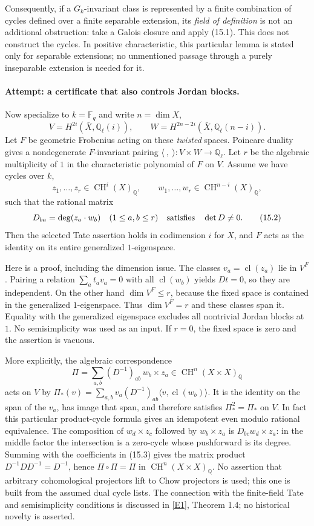 \documentclass[11pt,a4paper]{article}
\newcommand{\Q}{\mathbb{Q}}
\newcommand{\F}{\mathbb{F}}
\newcommand{\eref}[2]{\hyperlink{extra:#1:#2}{[E#2]}}
\begin{document}
Consequently, if a $G_k$-invariant class is represented by a finite
combination of cycles defined over a finite separable extension, its
\emph{field of definition} is not an additional obstruction: take a
Galois closure and apply (15.1). This does not construct the cycles.
In positive characteristic, this particular lemma is stated only for
separable extensions; no unmentioned passage through a purely inseparable
extension is needed for it.

\paragraph{Attempt: a certificate that also controls Jordan blocks.}
Now specialize to $k=\F_q$ and write $n=\dim X$,
\[
 V=H^{2i}(\bar X,\Q_\ell(i)),\qquad
 W=H^{2n-2i}(\bar X,\Q_\ell(n-i)).
\]
Let $F$ be geometric Frobenius acting on these \emph{twisted} spaces.
Poincare duality gives a nondegenerate $F$-invariant pairing
$\langle\ ,\ \rangle:V\times W\to\Q_\ell$.
Let $r$ be the algebraic multiplicity of $1$ in the characteristic
polynomial of $F$ on $V$. Assume we have cycles over $k$,
\[
 z_1,\ldots,z_r\in\operatorname{CH}^i(X)_{\Q},\qquad
 w_1,\ldots,w_r\in\operatorname{CH}^{n-i}(X)_{\Q},
\]
such that the rational matrix
\[
 D_{ba}=\deg(z_a\cdot w_b)\quad(1\leq a,b\leq r)
 \quad\hbox{satisfies}\quad\det D\ne0. \tag{15.2}
\]
Then the selected Tate assertion holds in codimension $i$ for $X$,
and $F$ acts as the identity on its entire generalized $1$-eigenspace.

Here is a proof, including the dimension issue. The classes
$v_a=\operatorname{cl}(z_a)$ lie in $V^F$. Pairing a relation
$\sum_a t_av_a=0$ with all $\operatorname{cl}(w_b)$ yields $Dt=0$,
so they are independent. On the other hand
$\dim V^F\leq r$, because the fixed space is contained in the generalized
$1$-eigenspace. Thus $\dim V^F=r$ and these classes span it.
Equality with the generalized eigenspace excludes all nontrivial Jordan
blocks at $1$. No semisimplicity was used as an input. If $r=0$,
the fixed space is zero and the assertion is vacuous.

More explicitly, the algebraic correspondence
\[
 \Pi=\sum_{a,b}(D^{-1})_{ab}\,w_b\times z_a
       \in\operatorname{CH}^n(X\times X)_{\Q} \tag{15.3}
\]
acts on $V$ by
$\Pi_*(v)=\sum_{a,b}v_a(D^{-1})_{ab}\langle v,\operatorname{cl}(w_b)\rangle$.
It is the identity on the span of the $v_a$, has image that span, and
therefore satisfies $\Pi_*^2=\Pi_*$ on $V$. In fact this particular
product-cycle formula gives an idempotent even modulo rational
equivalence. The composition of $w_d\times z_c$ followed by
$w_b\times z_a$ is $D_{bc}w_d\times z_a$: in the middle factor the
intersection is a zero-cycle whose pushforward is its degree. Summing
with the coefficients in (15.3) gives the matrix product
$D^{-1}DD^{-1}=D^{-1}$, hence $\Pi\circ\Pi=\Pi$ in
$\operatorname{CH}^n(X\times X)_{\Q}$. No assertion that arbitrary
cohomological projectors lift to Chow projectors is used; this one is
built from the assumed dual cycle lists. The connection with the
finite-field Tate and semisimplicity conditions is discussed in
\eref{30006680}{1}, Theorem 1.4; no historical novelty is asserted.
\end{document}
